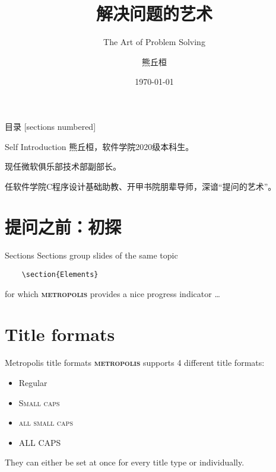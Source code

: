 \documentclass[10pt]{beamer}
\title{解决问题的艺术}
\subtitle{The Art of Problem Solving}
\date{\today}
\author{熊丘桓}
\institute{南京大学微软俱乐部}
\newcommand{\themename}{\textbf{\textsc{metropolis}}\xspace}
\begin{document}
\maketitle

\begin{frame}{目录}
    [sections numbered]
    \tableofcontents[hideallsubsections]
\end{frame}


\begin{frame}[fragile]{Self Introduction}
    熊丘桓，软件学院2020级本科生。

    现任微软俱乐部技术部副部长。

    任软件学院C程序设计基础助教、开甲书院朋辈导师，深谙“提问的艺术”。
\end{frame}

\section{提问之前：初探}

\begin{frame}[fragile]{Sections}
    Sections group slides of the same topic

    \begin{verbatim}    \section{Elements}\end{verbatim}

    for which \themename provides a nice progress indicator \ldots
\end{frame}

\section{Title formats}

\begin{frame}{Metropolis title formats}
    \themename supports 4 different title formats:
    \begin{itemize}
        \item Regular
        \item \textsc{Small caps}
        \item \textsc{all small caps}
        \item ALL CAPS
    \end{itemize}
    They can either be set at once for every title type or individually.
\end{frame}
\end{document}
